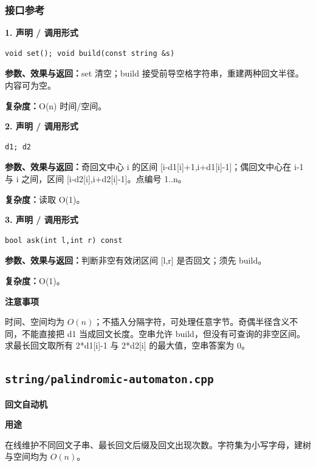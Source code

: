 \documentclass[UTF8,a4paper,10pt]{ctexart}
\newcommand{\TemplUsage}[1]{\textbf{用途}\par #1\par}
\newcommand{\TemplNote}[1]{\textbf{注意事项}\par #1\par}
\begin{document}
\subsubsection*{接口参考}
\noindent\begin{minipage}{\textwidth}
\textbf{1. 声明 / 调用形式}
\begin{lstlisting}
void set(); void build(const string &s)
\end{lstlisting}
\textbf{参数、效果与返回：}set 清空；build 接受前导空格字符串，重建两种回文半径。内容可为空。

\textbf{复杂度：}O(n) 时间/空间。

\end{minipage}\par\vspace{0.4em}
\noindent\begin{minipage}{\textwidth}
\textbf{2. 声明 / 调用形式}
\begin{lstlisting}
d1; d2
\end{lstlisting}
\textbf{参数、效果与返回：}奇回文中心 i 的区间 [i-d1[i]+1,i+d1[i]-1]；偶回文中心在 i-1 与 i 之间，区间 [i-d2[i],i+d2[i]-1]。点编号 1..n。

\textbf{复杂度：}读取 O(1)。

\end{minipage}\par\vspace{0.4em}
\noindent\begin{minipage}{\textwidth}
\textbf{3. 声明 / 调用形式}
\begin{lstlisting}
bool ask(int l,int r) const
\end{lstlisting}
\textbf{参数、效果与返回：}判断非空有效闭区间 [l,r] 是否回文；须先 build。

\textbf{复杂度：}O(1)。

\TemplNote{时间、空间均为 $O(n)$；不插入分隔字符，可处理任意字节。奇偶半径含义不同，不能直接把 d1 当成回文长度。空串允许 build，但没有可查询的非空区间。求最长回文取所有 2*d1[i]-1 与 2*d2[i] 的最大值，空串答案为 0。}
\end{minipage}\par\vspace{0.4em}
\clearpage
\subsection{\texttt{string/palindromic-automaton.cpp}}
\textbf{回文自动机}\par
\TemplUsage{在线维护不同回文子串、最长回文后缀及回文出现次数。字符集为小写字母，建树与空间均为 $O(n)$。}
\end{document}
